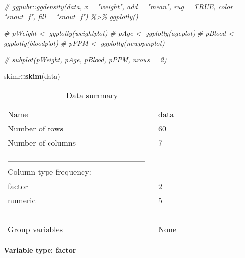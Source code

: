\documentclass[
]{article}
\newenvironment{Shaded}{\begin{snugshade}}{\end{snugshade}}
\newcommand{\CommentTok}[1]{\textcolor[rgb]{0.56,0.35,0.01}{\textit{#1}}}
\newcommand{\FunctionTok}[1]{\textcolor[rgb]{0.13,0.29,0.53}{\textbf{#1}}}
\newcommand{\NormalTok}[1]{#1}
\newcommand{\SpecialCharTok}[1]{\textcolor[rgb]{0.81,0.36,0.00}{\textbf{#1}}}
\begin{document}
\begin{Shaded}
\begin{Highlighting}[]
\CommentTok{\# ggpubr::ggdensity(data, x = "weight", add = "mean", rug = TRUE, color = "snout\_f", fill = "snout\_f") \%\textgreater{}\% ggplotly()}

\CommentTok{\# pWeight \textless{}{-} ggplotly(weightplot)}
\CommentTok{\# pAge \textless{}{-} ggplotly(ageplot)}
\CommentTok{\# pBlood \textless{}{-} ggplotly(bloodplot)}
\CommentTok{\# pPPM \textless{}{-} ggplotly(newppmplot)}

\CommentTok{\# subplot(pWeight, pAge, pBlood, pPPM, nrows = 2)}

\NormalTok{skimr}\SpecialCharTok{::}\FunctionTok{skim}\NormalTok{(data)}
\end{Highlighting}
\end{Shaded}

\begin{longtable}[]{@{}ll@{}}
\caption{Data summary}\tabularnewline
\toprule\noalign{}
\endfirsthead
\endhead
\bottomrule\noalign{}
\endlastfoot
Name & data \\
Number of rows & 60 \\
Number of columns & 7 \\
\_\_\_\_\_\_\_\_\_\_\_\_\_\_\_\_\_\_\_\_\_\_\_ & \\
Column type frequency: & \\
factor & 2 \\
numeric & 5 \\
\_\_\_\_\_\_\_\_\_\_\_\_\_\_\_\_\_\_\_\_\_\_\_\_ & \\
Group variables & None \\
\end{longtable}

\textbf{Variable type: factor}
\end{document}
